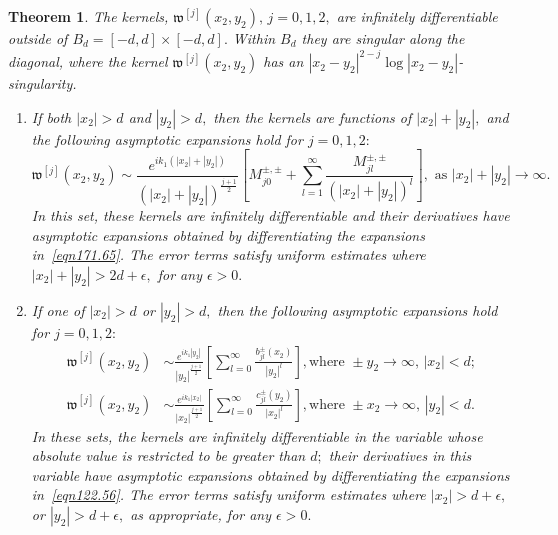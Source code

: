 \documentclass[11pt]{article}
\newcommand{\Bk}{\color{black}}
\newcommand{\Rd}{\color{black}}
\newcommand\fw{\mathfrak w}
\newtheorem{theorem}{Theorem}
\theoremstyle{definition}
\theoremstyle{remark}
\begin{document}
\begin{theorem}\label{thm00}
  The kernels, $\fw^{[j]}(x_2,y_2),\, j=0,1,2,$ are infinitely differentiable
  outside of $B_d=[-d,d]\times [-d,d].$ Within $B_d$ they are singular along the
  diagonal, where the kernel $\fw^{[j]}(x_2,y_2)$ has an
  $|x_2-y_2|^{2-j}\log|x_2-y_2|$-singularity. 

  
   \begin{enumerate}
   \item If both $|x_2|>d$ and $|y_2|>d,$ then \Rd the kernels are functions of
     $|x_2|+|y_2|,$ and \Bk the following asymptotic expansions hold for
     $j=0,1,2:$
     \begin{equation}\label{eqn171.65}
        \fw^{[j]}(x_2,y_2)\sim
        \frac{e^{ik_1(|x_2|+|y_2|)}}{(|x_2|+|y_2|)^{\frac{j+1}{2}}}\left[M^{\pm,\pm}_{j0}+\sum_{l=1}^{\infty}
          \frac{M^{\pm,\pm}_{jl}}{(|x_2|+|y_2|)^l}\right],\text{ as }|x_2|+|y_2|\to\infty.
     \end{equation}
 \Rd In this set, these kernels are infinitely differentiable and their
 derivatives have asymptotic expansions obtained by differentiating the
 expansions in~\eqref{eqn171.65}. The error terms satisfy uniform estimates
 where $|x_2|+|y_2|>2d+\epsilon,$ for any $\epsilon>0.$\Bk
  \item If one of $|x_2|>d$ or $|y_2|>d,$ then the following asymptotic
     expansions hold for $j=0,1,2:$ 
     \begin{equation}\label{eqn122.56}
       \begin{split}
        \fw^{[j]}(x_2,y_2)&\sim \frac{e^{ik_1|y_2|}}
           {|y_2|^{\frac{j+1}{2}}}\left[\sum_{l=0}^{\infty}\frac{b^{\pm}_{jl}(x_2)}{|y_2|^l}\right],
           \text{
           where } \pm y_2\to \infty,\, |x_2|<d;\\
              \fw^{[j]}(x_2,y_2)&\sim
       \frac{e^{ik_1|x_2|}}{|x_2|^{\frac{j+1}{2}}}\left[\sum_{l=0}^{\infty}
       \frac{c^{\pm}_{jl}(y_2)}{|x_2|^l}\right],       \text{
           where }\pm x_2\to \infty,\, |y_2|<d.
       \end{split}
     \end{equation}
  \Rd In these sets, the kernels are infinitely differentiable in the variable
  whose absolute value is restricted to be greater than $d;$ their derivatives
  in this variable have asymptotic expansions obtained by differentiating the
  expansions in~\eqref{eqn122.56}. The error terms satisfy uniform estimates
  where $|x_2|>d+\epsilon,$ or $|y_2|>d+\epsilon,$ as appropriate, for any
  $\epsilon>0.$\Bk\Bk

\end{enumerate}
\end{theorem}
\end{document}
